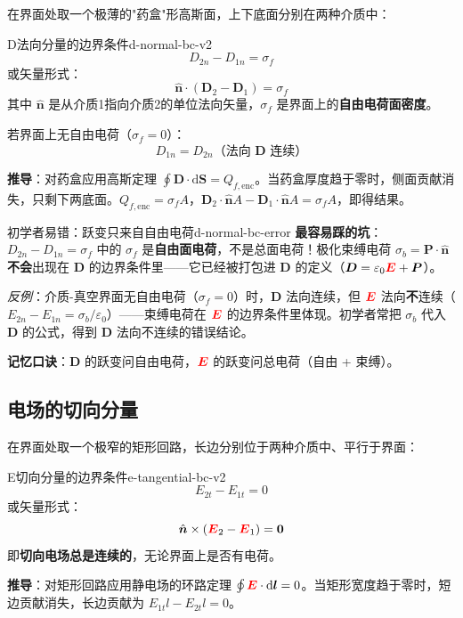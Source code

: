 \documentclass[11pt,a4paper,openany,oneside]{book}
\newcommand{\diff}{\mathrm{d}}
\newcommand{\vecE}{\textcolor{red}{\vect{E}}}
\newcommand{\eps}{\varepsilon}
\newcommand{\vect}[1]{\bm{#1}}
\newcommand{\unitvec}[1]{\hat{\vect{#1}}}
\begin{document}
在界面处取一个极薄的"药盒"形高斯面，上下底面分别在两种介质中：

\begin{theorem}{D法向分量的边界条件}{d-normal-bc-v2}
\[
D_{2n} - D_{1n} = \sigma_f
\]
或矢量形式：
\[
\unitvec{n} \cdot (\vect{D}_2 - \vect{D}_1) = \sigma_f
\]
其中 $\unitvec{n}$ 是从介质1指向介质2的单位法向矢量，$\sigma_f$ 是界面上的\textbf{自由电荷面密度}。

若界面上无自由电荷（$\sigma_f = 0$）：
\[
D_{1n} = D_{2n}\text{（法向 } \vect{D} \text{ 连续）}
\]
\end{theorem}

\textbf{推导}：对药盒应用高斯定理 $\oint\vect{D}\cdot\diff\vect{S} = Q_{f,\text{enc}}$。当药盒厚度趋于零时，侧面贡献消失，只剩下两底面。$Q_{f,\text{enc}} = \sigma_f A$，$\vect{D}_2\cdot\unitvec{n}A - \vect{D}_1\cdot\unitvec{n}A = \sigma_f A$，即得结果。

\begin{warning}{初学者易错：跃变只来自自由电荷}{d-normal-bc-error}
\textbf{最容易踩的坑}：$D_{2n} - D_{1n} = \sigma_f$ 中的 $\sigma_f$ 是\textbf{自由面电荷}，不是总面电荷！极化束缚电荷 $\sigma_b = \vect{P}\cdot\unitvec{n}$ \textbf{不会}出现在 $\vect{D}$ 的边界条件里——它已经被打包进 $\vect{D}$ 的定义（$\vect{D} = \eps_0\vecE + \vect{P}$）。

\textit{反例}：介质-真空界面无自由电荷（$\sigma_f = 0$）时，$\vect{D}$ 法向连续，但 $\vecE$ 法向\textbf{不}连续（$E_{2n} - E_{1n} = \sigma_b/\eps_0$）——束缚电荷在 $\vecE$ 的边界条件里体现。初学者常把 $\sigma_b$ 代入 $\vect{D}$ 的公式，得到 $\vect{D}$ 法向不连续的错误结论。

\textbf{记忆口诀}：$\vect{D}$ 的跃变问自由电荷，$\vecE$ 的跃变问总电荷（自由 + 束缚）。
\end{warning}

\subsection{电场的切向分量}

在界面处取一个极窄的矩形回路，长边分别位于两种介质中、平行于界面：

\begin{theorem}{E切向分量的边界条件}{e-tangential-bc-v2}
\[
E_{2t} - E_{1t} = 0
\]
或矢量形式：
\[
\unitvec{n} \times (\vecE_2 - \vecE_1) = \vect{0}
\]
即\textbf{切向电场总是连续的}，无论界面上是否有电荷。
\end{theorem}

\textbf{推导}：对矩形回路应用静电场的环路定理 $\oint\vecE\cdot\diff\vect{l} = 0$。当矩形宽度趋于零时，短边贡献消失，长边贡献为 $E_{1t}l - E_{2t}l = 0$。
\end{document}
